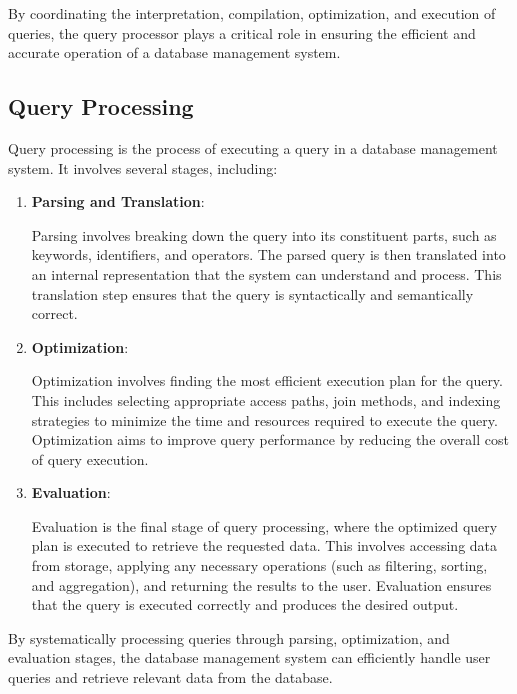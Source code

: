 \documentclass{article}
\begin{document}
By coordinating the interpretation, compilation, optimization, and execution of queries, the query processor plays a critical role in ensuring the efficient and accurate operation of a database management system.



\subsection*{Query Processing}

Query processing is the process of executing a query in a database management system. It involves several stages, including:

\begin{enumerate}
    \item \textbf{Parsing and Translation}:
    
    Parsing involves breaking down the query into its constituent parts, such as keywords, identifiers, and operators. The parsed query is then translated into an internal representation that the system can understand and process. This translation step ensures that the query is syntactically and semantically correct.
    
    \item \textbf{Optimization}:
    
    Optimization involves finding the most efficient execution plan for the query. This includes selecting appropriate access paths, join methods, and indexing strategies to minimize the time and resources required to execute the query. Optimization aims to improve query performance by reducing the overall cost of query execution.
    
    \item \textbf{Evaluation}:
    
    Evaluation is the final stage of query processing, where the optimized query plan is executed to retrieve the requested data. This involves accessing data from storage, applying any necessary operations (such as filtering, sorting, and aggregation), and returning the results to the user. Evaluation ensures that the query is executed correctly and produces the desired output.
\end{enumerate}

By systematically processing queries through parsing, optimization, and evaluation stages, the database management system can efficiently handle user queries and retrieve relevant data from the database.

\newpage
\end{document}

